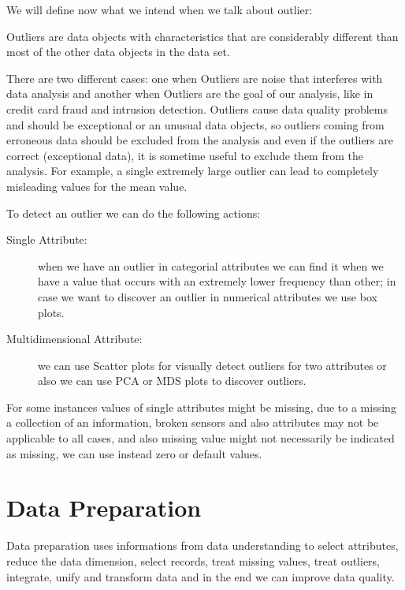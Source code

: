 We will define now what we intend when we talk about outlier:
\begin{defi}
    Outliers are data objects with characteristics that are considerably different than most of the other
    data objects in the data set.
\end{defi}
There are two different cases: one when Outliers are noise that interferes with data analysis and another
when Outliers are the goal of our analysis, like in credit card fraud and intrusion detection.\newline
Outliers cause data quality problems and should be exceptional or an unusual data objects, so 
outliers coming from erroneous data should be excluded from the analysis and even if the outliers are correct
(exceptional data), it is sometime useful to exclude them from the analysis.\newline
For example, a single extremely large outlier can lead to completely misleading values for the mean value.

To detect an outlier we can do the following actions:
\begin{description}
    \item [Single Attribute: ] when we have an outlier in categorial attributes we can find it when we have 
                               a value that occurs with an extremely lower frequency than other; in case we 
                               want to discover an outlier in numerical attributes we use box plots.
    \item [Multidimensional Attribute: ] we can use Scatter plots for visually detect outliers for two attributes or
                                         also we can use PCA or MDS plots to discover outliers.
\end{description}
For some instances values of single attributes might be missing, due to a missing a collection of an information,
broken sensors and also attributes may not be applicable to all cases, and also missing value might not
necessarily be indicated as missing, we can use instead zero or default values.

\section{Data Preparation}
Data preparation uses informations from data understanding to select attributes, reduce the data dimension,
select records, treat missing values, treat outliers, integrate, unify and transform data 
and in the end we can improve data quality.

